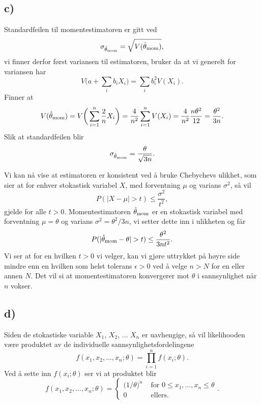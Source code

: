 \documentclass[a4paper, 11pt, titlepage, english]{article}
\begin{document}
\subsection*{c)}
Standardfeilen til momentestimatoren er gitt ved
$$\sigma_{\hat{\theta}_{\rm mom}} = \sqrt{V(\hat{\theta}_{\rm mom})},$$
vi finner derfor først variansen til estimatoren, bruker da at vi generelt for variansen har
$$V\bigg(a + \sum_i b_i X_i\bigg) = \sum_i b_i^2 V(X_i).$$
Finner at
$$V(\hat{\theta}_{\rm mom}) = V\bigg(\sum_{i=1}^n \frac{2}{n} X_i\bigg) = \frac{4}{n^2}\sum_{i=1}^n V(X_i) = \frac{4}{n^2}\frac{n\theta^2}{12} = \frac{\theta^2}{3n}.$$
Slik at standardfeilen blir
$$\sigma_{\hat{\theta}_{\rm mom}} = \frac{\theta}{\sqrt{3n}}.$$

Vi kan nå vise at estimatoren er konsistent ved å bruke Chebychevs ulikhet, som sier at for enhver stokastisk variabel $X$, med forventning $\mu$ og varians $\sigma^2$, så vil
$$P(|X-\mu| > t) \leq \frac{\sigma^2}{t^2},$$
gjelde for alle $t > 0$. Momentestimatoren $\hat{\theta}_{\rm mom}$ er en stokastisk variabel med forventning $\mu=\theta$ og varians $\sigma^2 = \theta^2/3n$, vi setter dette inn i ulikheten og får
$$P(|\hat{\theta}_{\rm mom} - \theta| > t) \leq \frac{\theta^2}{3nt^2}.$$
Vi ser at for en hvilken $t > 0$ vi velger, kan vi gjøre uttrykket på høyre side mindre enn en hvilken som helst tolerans $\epsilon > 0$ ved å velge $n > N$ for en eller annen $N$. Det vil si at momentestimatoren konvergerer mot $\theta$ i sannsynlighet når $n$ vokser.

\subsection*{d)}
Siden de stokastiske variable $X_1$, $X_2$, $\ldots$ $X_n$ er uavhengige, så vil likelihooden være produktet av de individuelle sannsynlighetsfordelingene
$$f(x_1, x_2, \ldots, x_n; \theta) = \prod_{i=1}^n f(x_i; \theta).$$
Ved å sette inn $f(x_i; \theta)$ ser vi at produktet blir 
$$
f(x_1, x_2, \ldots, x_n; \theta) = \begin{cases}
                                      \big(1/\theta)^n & \mbox{ for } 0 \leq x_1, \ldots, x_n \leq \theta\\
                                      0 & \mbox { ellers.}
                                     \end{cases}.
$$
\end{document}
